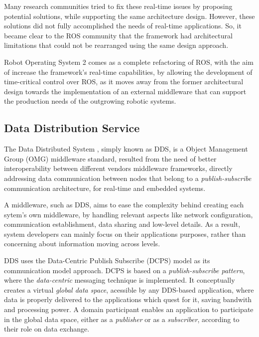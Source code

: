 Many research communities tried to fix these real-time issues by proposing potential solutions, while supporting the same architecture design. However, these solutions did not fully accomplished the needs of real-time applications. So, it became clear to the ROS community that the framework had architectural limitations that could not be rearranged using the same design approach. \cite{maruyama2016exploring}

Robot Operating System 2 comes as a complete refactoring of ROS, with the aim of increase the framework's real-time capabilities, by allowing the development of time-critical control over ROS, as it moves away from the former architectural design towards the implementation of an external middleware that can support the production needs of the outgrowing robotic systems. \cite{kim2018security, casini2019response}

\subsection{Data Distribution Service}

The Data Distributed System \cite{3}, simply known as DDS, is a Object Management Group (OMG) middleware standard, resulted from the need of better interoperability between different vendors middleware frameworks, directly addressing data communication between nodes that belong to a \textit{publish-subscribe} communication architecture, for real-time and embedded systems. 

A middleware, such as DDS, aims to ease the complexity behind creating each sytem's own middleware, by handling relevant aspects like network configuration, communication establishment, data sharing and low-level details. As a result, system developers can mainly focus on their applications purposes, rather than concerning about information moving across levels. \cite{dds-what-is} 

DDS uses the Data-Centric Publish Subscribe (DCPS) model as its communication model approach. DCPS is based on a \textit{publish-subscribe pattern}, where the \textit{data-centric} messaging technique is implemented. It conceptually creates a virtual \textit{global data space}, acessible by any DDS-based application, where data is properly delivered to the applications which quest for it, saving bandwith and processing power. \cite{3, pardo2005introduction} A domain participant enables an application to participate in the global data space, either as a \textit{publisher} or as a \textit{subscriber}, according to their role on data exchange. \cite{maruyama2016exploring, alaerjan2017modeling, dcps-rtps} 

